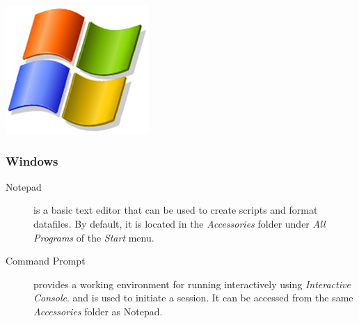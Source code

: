 \begin{flushleft}
	\begin{minipage}[c]{0.074\textwidth}
	   	\includegraphics[width=\textwidth]{figures/figlogowindows.jpg}
	\end{minipage}
	\quad
	\begin{minipage}[t]{0.88\textwidth}
		   	\subsubsection{Windows}
	\end{minipage}
		\begin{description}
			\item[Notepad] is a basic text editor that can be used to create \poy
			scripts and format datafiles. By default, it is located in the \emph{Accessories}
			folder under \emph{All Programs} of the \emph{Start} menu.
			\item[Command Prompt] provides a working environment for running \poy interactively using \poy \emph{Interactive Console}.
			\poy and is used to initiate a \poy session.
		It can be accessed from the same \emph{Accessories} folder as Notepad.
		\end{description}


\end{flushleft}
